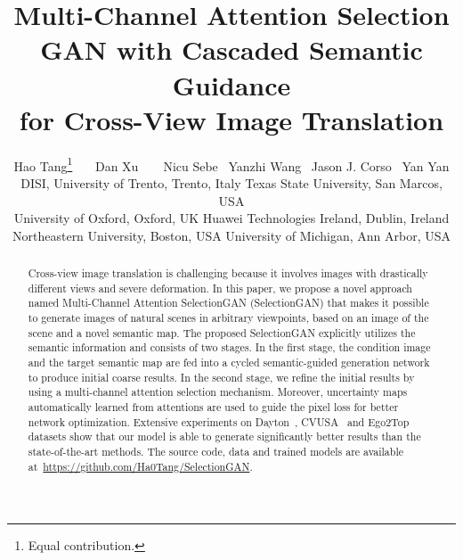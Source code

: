 \documentclass[10pt,twocolumn,letterpaper]{article}
\begin{document}
\title{Multi-Channel Attention Selection GAN with Cascaded Semantic Guidance \\ for Cross-View Image Translation}
\author{Hao Tang\thanks{Equal contribution.} \ \ \ Dan Xu\samethanks \ \ \ \ Nicu Sebe \ Yanzhi Wang \ Jason J. Corso \ Yan Yan\vspace{6pt}\\
DISI, University of Trento, Trento, Italy \quad
Texas State University, San Marcos, USA\\
University of Oxford, Oxford, UK \quad
Huawei Technologies Ireland, Dublin, Ireland\\
Northeastern University, Boston, USA \quad
University of Michigan, Ann Arbor, USA \\
}


\maketitle

\begin{abstract}
	Cross-view image translation is challenging because it involves  images with drastically different views and severe deformation.
	In this paper, we propose a novel approach named Multi-Channel Attention SelectionGAN (SelectionGAN) that makes it possible to generate images of natural scenes in arbitrary viewpoints, based on an image of the scene and a novel semantic map. The proposed SelectionGAN explicitly utilizes the semantic information and consists of two stages. In the first stage, the condition image and the target semantic map are fed into a cycled semantic-guided generation network to produce initial coarse results. In the second stage, we refine the initial results by using a multi-channel attention selection mechanism. Moreover, uncertainty maps automatically learned from attentions are used to guide the pixel loss for better network optimization. Extensive experiments on Dayton~\cite{vo2016localizing}, CVUSA~\cite{workman2015wide} and Ego2Top~\cite{ardeshir2016ego2top} datasets show that our model is able to generate significantly better results than the state-of-the-art methods. The source code, data and trained models are available at~\url{https://github.com/Ha0Tang/SelectionGAN}.
\end{abstract}
\end{document}
